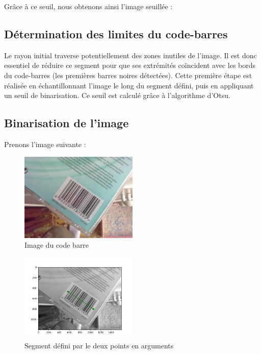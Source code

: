 \documentclass{rapport}
\begin{document}
Grâce à ce seuil, nous obtenons ainsi l'image seuillée : 

\subsection{Détermination des limites du code-barres}

Le rayon initial traverse potentiellement des zones inutiles de l'image. Il est donc essentiel de réduire ce segment pour que ses extrémités coïncident avec les bords du code-barres (les premières barres noires détectées).  
Cette première étape est réalisée en échantillonnant l’image le long du segment défini, puis en appliquant un seuil de binarisation. Ce seuil est calculé grâce à l’algorithme d’Otsu.  

\subsection{Binarisation de l'image}

Prenons l'image suivante :

\begin{figure}[H] %
	\centering
	\includegraphics[width=0.5\textwidth]{images/barcode0.jpg}
	\caption{Image du code barre}
	\label{code_barre}
\end{figure}

\begin{figure}[H] %
	\centering
	\includegraphics[width=0.5\textwidth]{images/code_barre_couple_vert.png}
	\caption{Segment défini par le deux points en arguments}
\end{figure}
\end{document}
